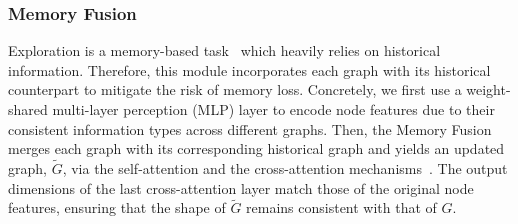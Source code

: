 \subsubsection{Memory Fusion}
Exploration is a memory-based task~\cite{memory_based} which heavily relies on historical information.
Therefore, this module incorporates each graph with its historical counterpart to mitigate the risk of memory loss. Concretely, we first use a weight-shared multi-layer perception (MLP) layer to encode node features due to their consistent information types across different graphs. Then, the Memory Fusion merges each graph with its corresponding historical graph and yields an updated graph, $\tilde{G}$, via the self-attention and the cross-attention mechanisms~\cite{attention}. The output dimensions of the last cross-attention layer match those of the original node features, ensuring that the shape of $\tilde{G}$ remains consistent with that of $G$.




